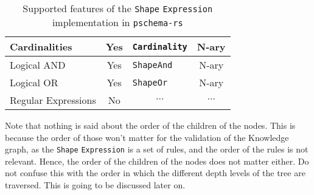 \begin{table}[ht]
\begin{tabular}{|l|c|l|c|}
        Cardinalities                                                  & {\color[HTML]{009901} Yes} & \texttt{Cardinality}                                                         & N-ary                                                               \\ \hline
        Logical AND                                                    & {\color[HTML]{009901} Yes} & \texttt{ShapeAnd}                                                            & N-ary                                                               \\ \hline
        Logical OR                                                     & {\color[HTML]{009901} Yes} & \texttt{ShapeOr}                                                             & N-ary                                                               \\ \hline
        Regular Expressions                                            & {\color[HTML]{FE0000} No}  & \multicolumn{1}{c|}{$\cdots$}                                                & \multicolumn{1}{c|}{$\cdots$}                                       \\ \hline
    \end{tabular}
    \caption{Supported features of the \texttt{Shape} \texttt{Expression} implementation in \texttt{pschema-rs}}
\end{table}


Note that nothing is said about the order of the children of the nodes. This is because the order of those won't matter for the validation of the Knowledge graph, as the \texttt{Shape} \texttt{Expression} is a set of rules, and the order of the rules is not relevant. Hence, the order of the children of the nodes does not matter either. Do not confuse this with the order in which the different depth levels of the tree are traversed. This is going to be discussed later on.

